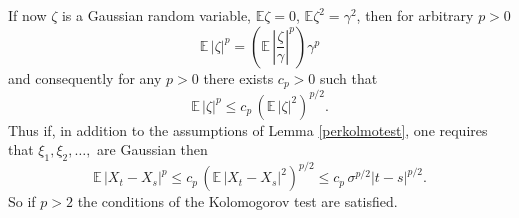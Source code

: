\documentclass[preprint]{imsart}
\def\E{\mathbb E}
\begin{document}
{\noindent If now $\zeta$ is a Gaussian random variable, $\E\zeta =0$,
$\E \zeta^2 =\gamma^2$, then for arbitrary $p>0$
$$
\E\, |\zeta|^p =
\left( \E\, \left| \frac{\zeta}{\gamma}\right|^p\right)
\gamma^p
$$
and consequently for any $p>0$ there exists $c_p >0$
such that
$$
\E\, |\zeta|^p \leq c_p\,
\left( \E\, \left|  \zeta \right|^2\right)^{p/2}.
$$
Thus if, in addition to the assumptions of Lemma
\ref{perkolmotest}, one requires that $\xi_1, \xi_2, \ldots, $ are
Gaussian then
$$
\E \, |X_t-X_s|^p\leq
c_p\, \left( \E \, |X_t-X_s|^2\right)^{p/2} \leq c_p \,
\sigma^{p/2} |t-s|^{p/2} .
$$
So if $p>2$ the conditions of the Kolomogorov test are
satisfied.
}
  
 
\end{document}
